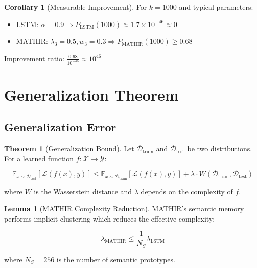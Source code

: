 \documentclass[12pt]{article}
\theoremstyle{definition}
\newtheorem{theorem}{Theorem}
\newtheorem{lemma}{Lemma}
\newtheorem{corollary}{Corollary}
\begin{document}
\begin{corollary}[Measurable Improvement]
For $k = 1000$ and typical parameters:
\begin{itemize}
\item LSTM: $\alpha = 0.9 \Rightarrow P_{\text{LSTM}}(1000) \approx 1.7 \times 10^{-46} \approx 0$
\item MATHIR: $\lambda_3 = 0.5, w_3 = 0.3 \Rightarrow P_{\text{MATHIR}}(1000) \geq 0.68$
\end{itemize}
Improvement ratio: $\frac{0.68}{10^{-46}} \approx 10^{46}$
\end{corollary}

\section{Generalization Theorem}

\subsection{Generalization Error}

\begin{theorem}[Generalization Bound]
Let $\mathcal{D}_{\text{train}}$ and $\mathcal{D}_{\text{test}}$ be two distributions.
For a learned function $f: \mathcal{X} \to \mathcal{Y}$:

\begin{equation}
\mathbb{E}_{x \sim \mathcal{D}_{\text{test}}}[\mathcal{L}(f(x), y)] \leq 
\mathbb{E}_{x \sim \mathcal{D}_{\text{train}}}[\mathcal{L}(f(x), y)] + 
\lambda \cdot W(\mathcal{D}_{\text{train}}, \mathcal{D}_{\text{test}})
\end{equation}

where $W$ is the Wasserstein distance and $\lambda$ depends on the complexity of $f$.
\end{theorem}

\begin{lemma}[MATHIR Complexity Reduction]
MATHIR's semantic memory performs implicit clustering which reduces 
the effective complexity:

\begin{equation}
\lambda_{\text{MATHIR}} \leq \frac{1}{N_S} \lambda_{\text{LSTM}}
\end{equation}

where $N_S = 256$ is the number of semantic prototypes.
\end{lemma}
\end{document}
